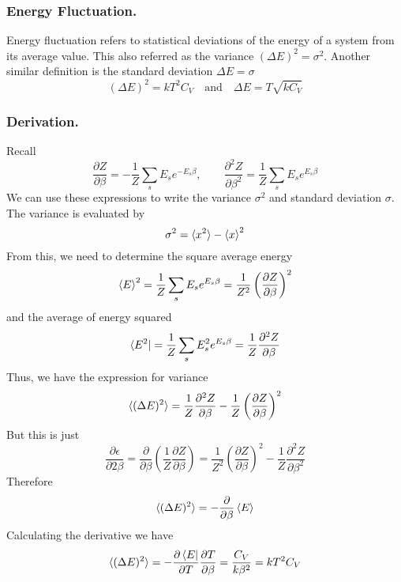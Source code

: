 \documentclass[../../../Main.tex]{subfiles}
\begin{document}
\subsubsection*{Energy Fluctuation.}
Energy fluctuation refers to statistical deviations of the energy of a system from its average value.
This also referred as the variance $(\Delta E)^2=\sigma^2$.
Another similar definition is the standard deviation $\Delta E=\sigma$
\begin{equation*}
	(\Delta E)^2=kT^2C_V\quad\text{and}\quad \Delta E=T\sqrt{kC_V}
\end{equation*}

\subsubsection*{Derivation.}
Recall 
\begin{equation*}
	\frac{\partial Z}{\partial \beta}=-\frac{1}{Z}\sum_sE_se^{-E_s\beta},\qquad\frac{\partial^2Z}{\partial \beta^2}=\frac{1}{Z}\sum_sE_se^{E_s\beta}
\end{equation*}
We can use these expressions to write the variance $\sigma^2$ and standard deviation $\sigma$. 
The variance is evaluated by
\begin{equation*}
	\sigma^2=\braket{x^2}-\braket{x}^2
\end{equation*}
From this, we need to determine the square average energy 
\begin{equation*}
	\braket{E}^2=\frac{1}{Z}\sum_s E_se^{E_s\beta}=\frac{1}{Z^2}\left(\frac{\partial Z}{\partial \beta}\right)^2
\end{equation*}
and the average of energy squared
\begin{equation*}
	\bra{E^2}=\frac{1}{Z}\sum_sE_s^2e^{E_s\beta}=\frac{1}{Z}\frac{\partial^2Z}{\partial\beta}
\end{equation*}
Thus, we have the expression for variance
\begin{equation*}
	\braket{(\Delta E)^2}=\frac{1}{Z}\frac{\partial^2Z}{\partial\beta}-\frac{1}{Z}\left(\frac{\partial Z}{\partial \beta}\right)^2
\end{equation*}
But this is just 
\begin{equation*}
	\frac{\partial \epsilon}{\partial 2\beta}=\frac{\partial}{\partial \beta}\left(\frac{1}{Z}\frac{\partial Z}{\partial \beta}\right)=\frac{1}{Z^2}\left(\frac{\partial Z}{\partial \beta}\right)^2-\frac{1}{Z}\frac{\partial^2Z}{\partial\beta^2}
\end{equation*}
Therefore
\begin{equation*}
	\braket{(\Delta E )^2}=-\frac{\partial }{\partial\beta}\braket{E}
\end{equation*}
Calculating the derivative we have 
\begin{equation*}
	\braket{(\Delta E )^2}=-\frac{\partial\bra{E}}{\partial T}\frac{\partial T}{\partial \beta}=\frac{C_V}{k\beta^2}=kT^2C_V
\end{equation*}
\end{document}
